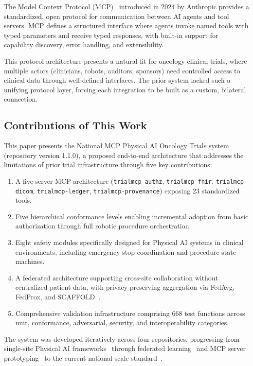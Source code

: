 \documentclass{article}
\begin{document}
The Model Context Protocol (MCP)~\cite{mcp2024protocol} introduced in 2024 by Anthropic provides a standardized, open protocol for communication between AI agents and tool servers. MCP defines a structured interface where agents invoke named tools with typed parameters and receive typed responses, with built-in support for capability discovery, error handling, and extensibility.

This protocol architecture presents a natural fit for oncology clinical trials, where multiple actors (clinicians, robots, auditors, sponsors) need controlled access to clinical data through well-defined interfaces. The prior system lacked such a unifying protocol layer, forcing each integration to be built as a custom, bilateral connection.

\subsection{Contributions of This Work}

This paper presents the National MCP Physical AI Oncology Trials system (repository version 1.1.0), a proposed end-to-end architecture that addresses the limitations of prior trial infrastructure through five key contributions:

\begin{enumerate}[leftmargin=*]
\item A five-server MCP architecture (\texttt{trialmcp-authz}, \texttt{trialmcp-fhir}, \texttt{trialmcp-dicom}, \texttt{trialmcp-ledger}, \texttt{trialmcp-provenance}) exposing 23 standardized tools.
\item Five hierarchical conformance levels enabling incremental adoption from basic authorization through full robotic procedure orchestration.
\item Eight safety modules specifically designed for Physical AI systems in clinical environments, including emergency stop coordination and procedure state machines.
\item A federated architecture supporting cross-site collaboration without centralized patient data, with privacy-preserving aggregation via FedAvg, FedProx, and SCAFFOLD~\cite{mcmahan2017fedavg,kairouz2021federated}.
\item Comprehensive validation infrastructure comprising 668 test functions across unit, conformance, adversarial, security, and interoperability categories.
\end{enumerate}

The system was developed iteratively across four repositories, progressing from single-site Physical AI frameworks~\cite{kawchak2026physicalai} through federated learning~\cite{kawchak2026paifl} and MCP server prototyping~\cite{kawchak2026trialmcp} to the current national-scale standard~\cite{kawchak2026national}.
\end{document}
